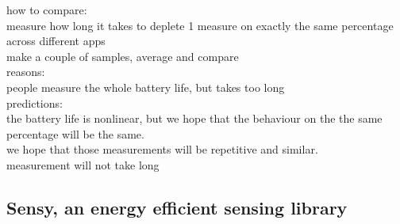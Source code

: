 how to compare:\\
	measure how long it takes to deplete 1%
		measure on exactly the same percentage across different apps\\
		make a couple of samples, average and compare\\
		reasons:\\
			people measure the whole battery life, but takes too long\\
		predictions:\\
			the battery life is nonlinear, but we hope that the behaviour on the the same percentage will be the same.\\
			we hope that those measurements will be repetitive and similar.\\
			measurement will not take long\\
			
			
		
		
		
\subsection{Sensy, an energy efficient sensing library}

